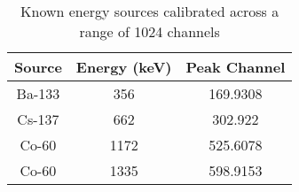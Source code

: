 \begin{table}[H]
    \centering
    \begin{tabular}{|c|c|c|}
    \hline
    Source & Energy (keV) & Peak Channel \\ \hline
    Ba-133 & 356 & 169.9308 \\ \hline
    Cs-137 & 662 & 302.922 \\ \hline
    Co-60 & 1172 & 525.6078 \\ \hline
    Co-60 & 1335 & 598.9153 \\ \hline
    \end{tabular}
    \caption{Known energy sources calibrated across a range of 1024 channels}
    \label{tab:cal}
    \end{table}